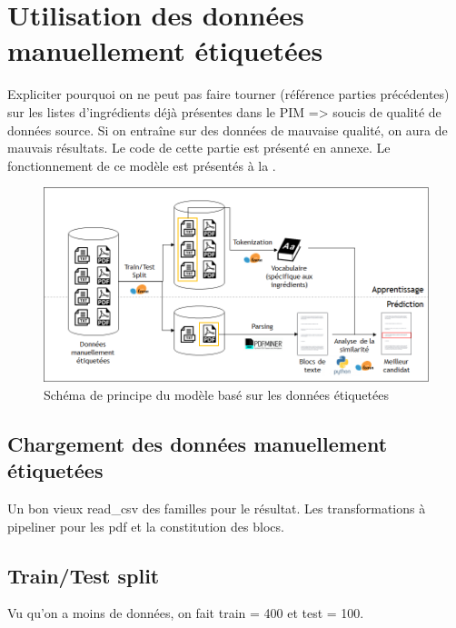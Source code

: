     \chapter{Utilisation des données manuellement étiquetées}

    Expliciter pourquoi on ne peut pas faire tourner (référence parties précédentes) sur les listes d'ingrédients déjà présentes dans le PIM => soucis de qualité de données source. 
    Si on entraîne sur des données de mauvaise qualité, on aura de mauvais résultats.
    Le code de cette partie est présenté en annexe.    
    Le fonctionnement de ce modèle est présentés à la .
    
    \begin{figure}[htbp]
        \begin{center}
        \includegraphics[width=0.9\linewidth]{img/ground_truth_model.png}
        \end{center}
        \caption{Schéma de principe du modèle basé sur les données étiquetées}
        \label{fig:ground_truth_model}
    \end{figure}     


        \section{Chargement des données manuellement étiquetées}

        Un bon vieux read\_csv des familles pour le résultat.
        Les transformations à pipeliner pour les pdf et la constitution des blocs.

        \section{Train/Test split}

        Vu qu'on a moins de données, on fait train = 400 et test = 100.


